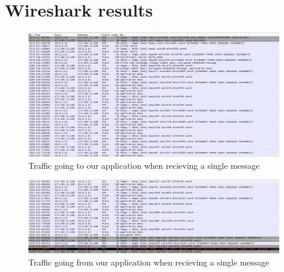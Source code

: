 \chapter{Wireshark results}

\begin{figure}[h!]
\begin{center}
\includegraphics[height=0.6\textwidth, angle=-90]{ws1}
\end{center}
\caption{Traffic going to our application when recieving a single message} \label{fig:ws1}
\end{figure}

\begin{figure}[h!]
\begin{center}
\includegraphics[height=0.38\textwidth, angle=-90]{ws2}
\end{center}
\caption{Traffic going from our application when recieving a single message} \label{fig:ws2}
\end{figure}


